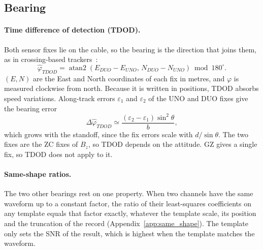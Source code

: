 \subsection{Bearing}\label{subsec:bearing}

\paragraph{Time difference of detection (TDOD).}
Both sensor fixes lie on the cable, so the bearing is the direction that joins them, as in crossing-based trackers~\cite{bharti2020semi}:
\begin{equation}
\hat{\varphi}_{TDOD} = \operatorname{atan2}\left(E_{DUO} - E_{UNO},\, N_{DUO} - N_{UNO}\right) \bmod 180^\circ.
\label{eq:tdod}
\end{equation}
$(E, N)$ are the East and North coordinates of each fix in metres, and $\varphi$ is measured clockwise from north. Because it is written in positions, TDOD absorbs speed variations. Along-track errors $\varepsilon_1$ and $\varepsilon_2$ of the UNO and DUO fixes give the bearing error
\begin{equation}
\Delta\hat{\varphi}_{TDOD} \simeq \frac{(\varepsilon_2 - \varepsilon_1)\sin^2\theta}{b},
\label{eq:tdod_error}
\end{equation}
which grows with the standoff, since the fix errors scale with $d/\sin\theta$. The two fixes are the ZC fixes of $B_z$, so TDOD depends on the attitude. GZ gives a single fix, so TDOD does not apply to it.

\paragraph{Same-shape ratios.}
The two other bearings rest on one property. When two channels have the same waveform up to a constant factor, the ratio of their least-squares coefficients on any template equals that factor exactly, whatever the template scale, its position and the truncation of the record (Appendix~\ref{app:same_shape}). The template only sets the SNR of the result, which is highest when the template matches the waveform.

